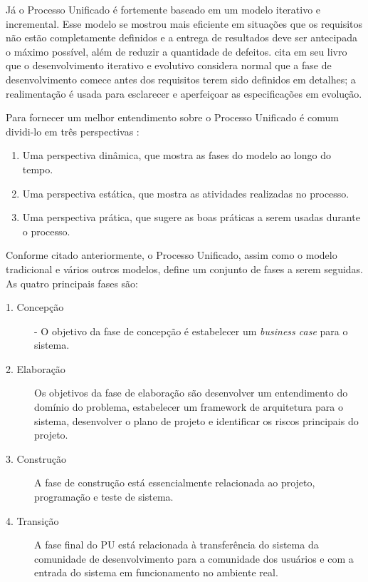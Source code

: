 \documentclass[
	article,			%
	11pt,				%
	oneside,			%
	a4paper,			%
	english,			%
	brazil,				%
	sumario=tradicional
	]{abntex2}
\begin{document}
Já o Processo Unificado é fortemente baseado em um modelo
iterativo e incremental. Esse modelo se mostrou mais eficiente em situações que os
requisitos não estão completamente definidos e a entrega de resultados deve ser
antecipada o máximo possível, além de reduzir a quantidade de defeitos.
 cita em seu livro que o desenvolvimento
iterativo e evolutivo considera normal que a fase de desenvolvimento comece
antes dos requisitos terem sido definidos em detalhes; a realimentação é usada
para esclarecer e aperfeiçoar as especificações em evolução.

Para fornecer um melhor entendimento sobre o Processo Unificado é comum
dividi-lo em três perspectivas \cite{sommerville2007}:

\begin{enumerate}
   \item Uma perspectiva dinâmica, que mostra as fases do modelo ao longo do
   tempo.
   \item Uma perspectiva  estática, que mostra as atividades realizadas no
   processo.
   \item Uma perspectiva prática, que sugere as boas práticas a serem usadas
   durante o processo.
\end{enumerate}

Conforme citado anteriormente, o Processo Unificado, assim como o modelo
tradicional e vários outros modelos, define um conjunto de fases a serem
seguidas. As quatro principais fases são:

\begin{description}
   \item[1. Concepção] - O objetivo da fase de concepção é estabelecer um
   \textit{business case} para o sistema.
   \item[2. Elaboração] Os objetivos da fase de elaboração são desenvolver um
   entendimento do domínio do problema, estabelecer um framework de arquitetura
   para o sistema, desenvolver o plano de projeto e identificar os riscos
   principais do projeto.
   \item[3. Construção] A fase de construção está essencialmente relacionada ao
   projeto, programação e teste de sistema.
   \item[4. Transição] A fase final do PU está relacionada à transferência do
   sistema da comunidade de desenvolvimento para a comunidade dos usuários e com
   a entrada do sistema em funcionamento no ambiente real.
\end{description}
\end{document}
